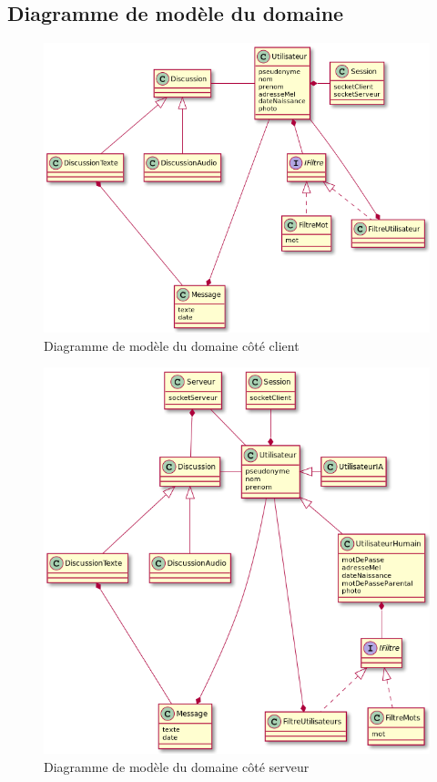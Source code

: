 \documentclass[a4paper,12pt]{article}
\begin{document}
\subsection{Diagramme de modèle du domaine}

\begin{figure}[H]
	\centerline{\includegraphics[width=16.5cm]{diagMDC.png}}
	\caption{Diagramme de modèle du domaine côté client}
\end{figure}

\begin{figure}[H]
	\centerline{\includegraphics[width=16.5cm]{diagMDS.png}}
	\caption{Diagramme de modèle du domaine côté serveur}
\end{figure}
\end{document}
